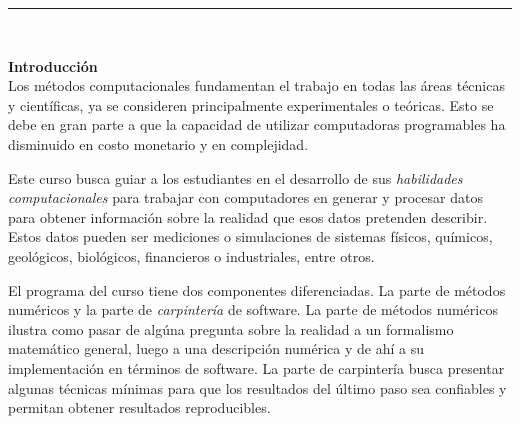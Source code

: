 \documentclass[letterpaper,10pt,onecolumn]{article}
\begin{document}





\noindent\rule{\textwidth}{1pt}\\[-0.1cm]

\addtocounter{mysection}{1}

\noindent\textbf{\large {} \quad Introducci\'on}\\[-0.2cm]


\noindent\normalsize Los m\'etodos computacionales fundamentan el
trabajo en todas las \'areas t\'ecnicas y cient\'ificas,
ya se consideren principalmente experimentales o te\'oricas. 
Esto se debe en gran parte a que la capacidad de utilizar computadoras
programables ha disminuido en costo monetario y en complejidad.

Este curso busca guiar a los estudiantes en el desarrollo de sus
\emph{habilidades computacionales} para trabajar con computadores
 en generar y procesar datos para obtener informaci\'on sobre la
realidad que esos datos pretenden  describir. 
Estos datos pueden ser mediciones o simulaciones de
sistemas f\'isicos, qu\'imicos, geol\'ogicos, biol\'ogicos,
financieros o industriales, entre otros.     

El programa del curso tiene dos componentes diferenciadas. 
La parte de m\'etodos num\'ericos  y la parte de \emph{carpinter\'ia}
de software.  
La parte de m\'etodos num\'ericos ilustra como pasar de alg\'una
pregunta sobre la realidad a un formalismo matem\'atico general, luego
a una descripci\'on num\'erica y de ah\'i a su implementaci\'on en
t\'erminos de software. 
La parte de carpinter\'ia busca presentar algunas t\'ecnicas 
m\'inimas para que los resultados del \'ultimo paso sea confiables y
permitan obtener resultados reproducibles.
\\[0.1cm]
\end{document}

